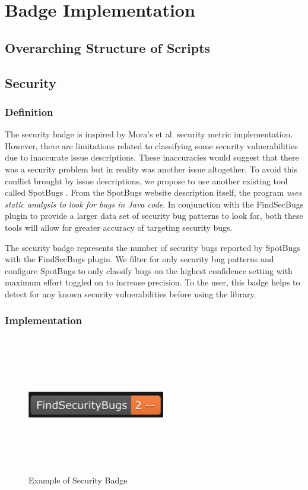 \documentclass[12pt, letterpaper]{article}
\begin{document}
\section{Badge Implementation}
\subsection{Overarching Structure of Scripts}

\subsection{Security}
\subsubsection{Definition}
The security badge is inspired by Mora's et al. \cite{metrics} security metric implementation.
However, there are limitations related to classifying some security vulnerabilities due to inaccurate
issue descriptions. These inaccuracies would suggest that there was a security problem but in reality was another issue altogether.
To avoid this conflict brought by issue descriptions, 
we propose to use another existing tool called SpotBugs \cite{spotbugs}.
From the SpotBugs \cite{spotbugs} website description itself, the program \textit{uses static analysis to look for bugs in Java code}.
In conjunction with the FindSecBugs \cite{findsecbugs} plugin to provide a larger data set of security bug patterns to look for, 
both these tools will allow for greater accuracy of targeting security bugs.

The security badge represents the number of security bugs reported by SpotBugs \cite{spotbugs} with the FindSecBugs \cite{findsecbugs} plugin.
We filter for only security bug patterns and configure SpotBugs to only classify bugs on the highest confidence setting
with maximum effort toggled on to increase precision. To the user, this badge helps to detect
for any known security vulnerabilities before using the library. 

\subsubsection{Implementation}

\begin{figure}[!htb]
    \centerline{
        \includegraphics[width=6cm,height=6cm,keepaspectratio=true]{findsecbugsbadge}
    }
    \caption{
        Example of Security Badge
    }
    \label{findsecbugsbadge}
\end{figure}
\end{document}
